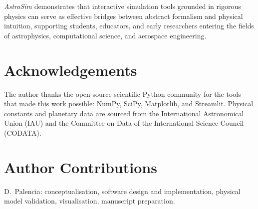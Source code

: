 \documentclass[10pt,a4paper]{article}
\begin{document}
\textit{AstroSim} demonstrates that interactive simulation tools grounded in
rigorous physics can serve as effective bridges between abstract formalism and
physical intuition, supporting students, educators, and early researchers
entering the fields of astrophysics, computational science, and aerospace
engineering.

\section*{Acknowledgements}

The author thanks the open-source scientific Python community for the tools
that made this work possible: NumPy, SciPy, Matplotlib, and Streamlit.
Physical constants and planetary data are sourced from the International
Astronomical Union (IAU) and the Committee on Data of the International
Science Council (CODATA).

\section*{Author Contributions}

D.~Palencia: conceptualisation, software design and implementation,
physical model validation, visualisation, manuscript preparation.



\end{document}
